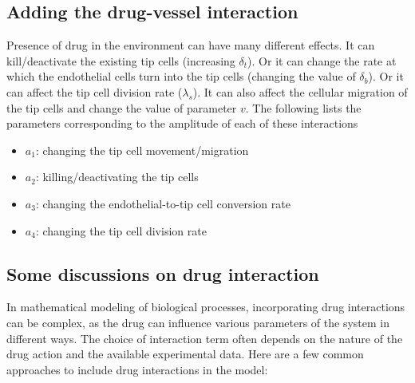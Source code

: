 \subsection*{Adding the drug-vessel interaction}
Presence of drug in the environment can have many different effects. It can kill/deactivate the existing tip cells (increasing $\delta_t$). Or it can change the rate at which the endothelial cells turn into the tip cells (changing the value of $\delta_b$). Or it can affect the tip cell division rate ($\lambda_s$). It can also affect the cellular migration of the tip cells and change the value of parameter $v$. The following lists the parameters corresponding to the amplitude of each of these interactions
\begin{itemize}
	\item $a_1$: changing the tip cell movement/migration
	\item $a_2$: killing/deactivating the tip cells
	\item $a_3$: changing the endothelial-to-tip cell conversion rate
	\item $a_4$: changing the tip cell division rate
\end{itemize}


\subsection*{Some discussions on drug interaction}
In mathematical modeling of biological processes, incorporating drug interactions can be complex, as the drug can influence various parameters of the system in different ways. The choice of interaction term often depends on the nature of the drug action and the available experimental data.
Here are a few common approaches to include drug interactions in the model:

